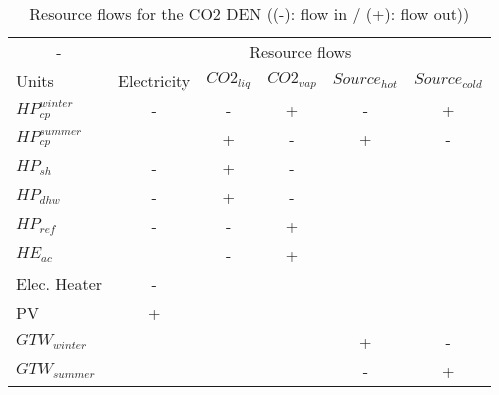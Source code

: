 \begin{table}[h!]
	\centering
	\caption{Resource flows for the CO2 DEN ((-): flow in / (+): flow out))}\vspace{2mm}
	\label{tab:layers_CO2} 
	\begin{tabular}{lccccc} \toprule
		\multicolumn{1}{c}{-} & \multicolumn{5}{c}{Resource flows}                                          \\
		Units                 & Electricity & $CO2_{liq}$ & $CO2_{vap}$ & $Source_{hot}$ & $Source_{cold}$ \\ \midrule
		$HP_{cp}^{winter}$    & -           & -           & +           & -              & +               \\
		$HP_{cp}^{summer}$    &             & +           & -           & +              & -               \\
		$HP_{sh}$             & -           & +           & -           &                &                 \\
		$HP_{dhw}$            & -           & +           & -           &                &                 \\
		$HP_{ref}$            & -           & -           & +           &                &                 \\
		$HE_{ac}$             &             & -           & +           &                &                 \\
		Elec. Heater          & -           &             &             &                &                 \\
		PV                    & +           &             &             &                &                 \\
		$GTW_{winter}$        &             &             &             & +              & -               \\
		$GTW_{summer}$        &             &             &             & -              & +         \\ \bottomrule     
	\end{tabular}
\end{table}
